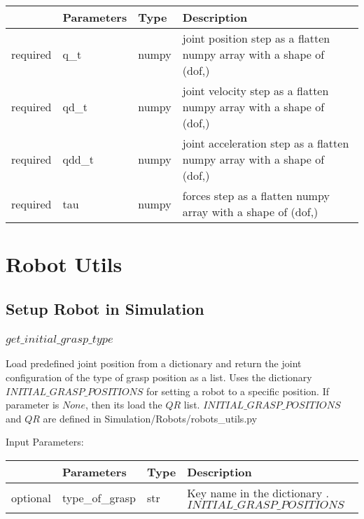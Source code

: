 \documentclass[
	ngerman,
	accentcolor=9c,%
	type=intern,
	marginpar=false
	]{tudapub}
\begin{document}
\begin{tabular}{|p{}|p{}|p{}| p{}|}
\hline
 & \textbf{Parameters} & \textbf{Type} & \textbf{Description} \\
\hline
required & q\_t & numpy &    joint position step as a flatten numpy array with a shape of (dof,)\\
\hline
required & qd\_t & numpy & joint velocity step as a flatten numpy array with a shape of (dof,)\\
\hline
required & qdd\_t & numpy & joint acceleration step as a flatten numpy array with a shape of (dof,)\\
\hline
required & tau  & numpy & forces step as a flatten numpy array with a shape of (dof,)\\
\hline
\end{tabular}
\vspace{1cm}





\newpage
\section{Robot Utils}
\subsection{Setup Robot in Simulation}

\subsubsection{$get\_initial\_grasp\_type$}
\noindent Load predefined joint position from a dictionary and return the joint configuration of the type of grasp position as a list. Uses the dictionary $INITIAL\_GRASP\_POSITIONS$ for setting a robot to a specific position. If parameter is $None$, then its load the $QR$ list. $INITIAL\_GRASP\_POSITIONS$ and $QR$ are defined in Simulation/Robots/robots\_utils.py

\vspace{0.5cm}
\noindent Input Parameters:
\vspace{0.5cm}

\begin{tabular}{|p{}|p{}|p{}| p{}|}
\hline
 & \textbf{Parameters} & \textbf{Type} & \textbf{Description} \\
\hline
optional & type\_of\_grasp & str & Key name in the dictionary . $INITIAL\_GRASP\_POSITIONS$ \\
\hline
\end{tabular}
\end{document}
